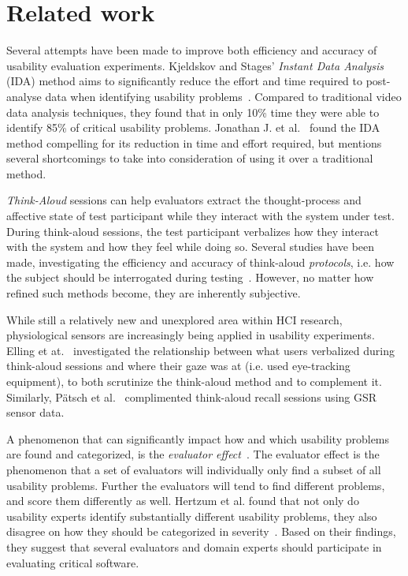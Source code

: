 \section{Related work}
Several attempts have been made to improve both efficiency and accuracy of
usability evaluation experiments. Kjeldskov and Stages' \textit{Instant Data
Analysis} (IDA) method aims to significantly reduce the effort and time required
to post-analyse data when identifying usability
problems~\cite{instant_data_analysis}. Compared to traditional video data
analysis techniques, they found that in only 10\% time they were able to
identify 85\% of critical usability problems. Jonathan J. et
al.~\cite{use_of_TA_and_IDA} found the IDA
method compelling for its reduction in time and effort required, but mentions
several shortcomings to take into consideration of using it over a traditional
method.

\textit{Think-Aloud} sessions can help evaluators extract the thought-process
and affective state of test participant while they interact with the system
under test. During think-aloud sessions, the test participant verbalizes how
they interact with the system and how they feel while doing so.  Several studies
have been made, investigating the efficiency and accuracy of think-aloud
\textit{protocols}, i.e. how the subject should be interrogated during
testing~\cite{two_think_aloud_protocols_study}. However, no matter how refined
such methods become, they are inherently subjective.

While still a relatively new and unexplored area within HCI research,
physiological sensors are increasingly being applied in usability experiments.
Elling et at.~\cite{concurrent_think_aloud_eye_tracking} investigated the
relationship between what users verbalized during think-aloud sessions and where
their gaze was at (i.e. used eye-tracking equipment), to both scrutinize the
think-aloud method and to complement it. Similarly, P\"{a}tsch et
al.~\cite{using_sensor_graphs_think_aloud} complimented think-aloud recall
sessions using GSR sensor data.

A phenomenon that can significantly impact how and which usability problems are
found and categorized, is the \textit{evaluator effect}~\cite{eval_effect}.
The evaluator effect is the phenomenon that a set of evaluators will individually only find a subset of all usability problems.
Further the evaluators will tend to find different problems, and score them differently as well.\cite{eval_effect}
Hertzum et al. found that not only do
usability experts identify substantially different usability problems, they also
disagree on how they should be categorized in
severity~\cite{eval_effect_research}. Based on their findings, they suggest that
several evaluators and domain experts should participate in evaluating critical
software.

